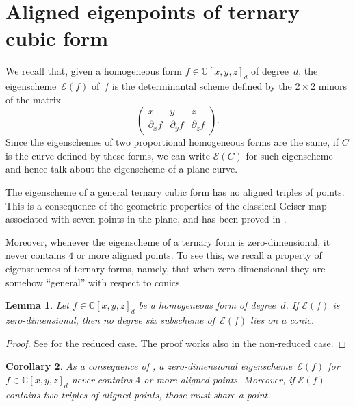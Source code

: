 \documentclass{amsart}
\theoremstyle{plain}
\newtheorem{lemma}{Lemma}[section]
\newtheorem{corollary}[lemma]{Corollary}
\theoremstyle{definition}
\newcommand{\C}{\mathbb{C}}
\newcommand{\de}{\partial}
\newcommand{\Eig}[1]{\mathcal{E}\!\left( {#1} \right)}
\begin{document}
\section{Aligned eigenpoints of ternary cubic form}
\label{aligned}

We recall that, given a homogeneous form $f \in \C[x,y,z]_d$ of degree~$d$, the eigenscheme~$\Eig{f}$ of~$f$ is the determinantal scheme defined by the $2 \times 2$ minors of the matrix
%
\begin{equation}
\label{eq:def_matrix}
    \begin{pmatrix}
    x & y & z \\
    \de_x f & \de_y f & \de_z f
    \end{pmatrix}.
\end{equation}
%
Since the eigenschemes of two proportional homogeneous forms are the same,
if $C$ is the curve defined by these forms,
we can write $\Eig{C}$ for such eigenscheme and hence talk about the eigenscheme of a plane curve.

The eigenscheme of a general ternary cubic form has no aligned triples of points. This is a consequence of the geometric properties of the classical Geiser map associated with seven points in the plane, and has been proved in \cite[Proposition~4.5]{BGV}.

Moreover, whenever the eigenscheme of a ternary form is zero-dimensional, it never contains $4$ or more aligned points.
To see this, we recall a property of eigenschemes of ternary forms, namely,
that when zero-dimensional they are somehow ``general'' with respect to conics.

\begin{lemma}
\label{lemma:no_six_conic}
Let $f \in \C[x,y,z]_d$ be a homogeneous form of degree~$d$.
If $\Eig{f}$ is zero-dimensional,
then no degree six subscheme of~$\Eig{f}$ lies on a conic.
\end{lemma}
\begin{proof}
See \cite[Lemma~9.1]{OS1} for the reduced case.
The proof works also in the non-reduced case.
\end{proof}

\begin{corollary}
\label{corollary:general_no_triple}
As a consequence of , a zero-dimensional eigenscheme~$\Eig{f}$ for $f \in \C[x,y,z]_d$ never contains $4$ or more aligned points.
Moreover, if $\Eig{f}$ contains two triples of aligned points, those must share a point.
\end{corollary}
\end{document}
